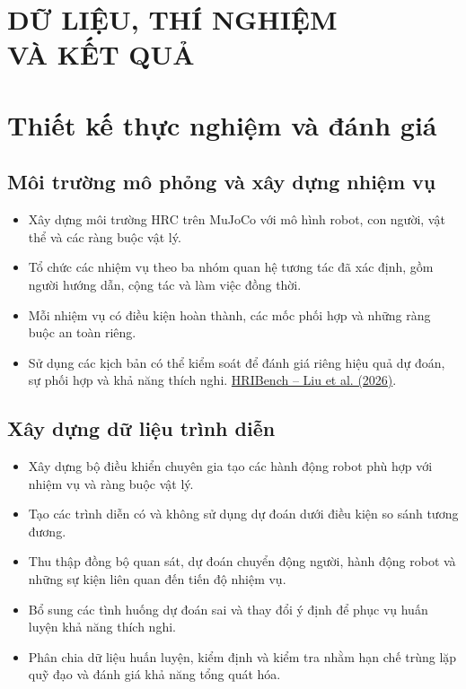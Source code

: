 \chapter[DỮ LIỆU, THÍ NGHIỆM VÀ KẾT QUẢ]{DỮ LIỆU, THÍ NGHIỆM\\VÀ KẾT QUẢ}
\label{chap:experiments}


\chapter{Thiết kế thực nghiệm và đánh giá}

\section{Môi trường mô phỏng và xây dựng nhiệm vụ}

\begin{itemize}
    \item Xây dựng môi trường HRC trên MuJoCo với mô hình robot, con người, vật thể và các ràng buộc vật lý.

    \item Tổ chức các nhiệm vụ theo ba nhóm quan hệ tương tác đã xác định, gồm người hướng dẫn, cộng tác và làm việc đồng thời.

    \item Mỗi nhiệm vụ có điều kiện hoàn thành, các mốc phối hợp và những ràng buộc an toàn riêng.

    \item Sử dụng các kịch bản có thể kiểm soát để đánh giá riêng hiệu quả dự đoán, sự phối hợp và khả năng thích nghi.
    \href{https://arxiv.org/abs/2607.13056}{HRIBench -- Liu et al. (2026)}.
\end{itemize}


\section{Xây dựng dữ liệu trình diễn}

\begin{itemize}
    \item Xây dựng bộ điều khiển chuyên gia tạo các hành động robot phù hợp với nhiệm vụ và ràng buộc vật lý.

    \item Tạo các trình diễn có và không sử dụng dự đoán dưới điều kiện so sánh tương đương.

    \item Thu thập đồng bộ quan sát, dự đoán chuyển động người, hành động robot và những sự kiện liên quan đến tiến độ nhiệm vụ.

    \item Bổ sung các tình huống dự đoán sai và thay đổi ý định để phục vụ huấn luyện khả năng thích nghi.

    \item Phân chia dữ liệu huấn luyện, kiểm định và kiểm tra nhằm hạn chế trùng lặp quỹ đạo và đánh giá khả năng tổng quát hóa.
\end{itemize}


